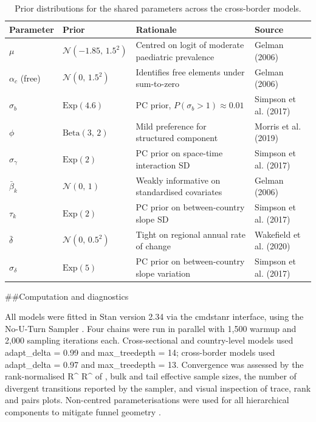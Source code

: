 \documentclass{article}
\begin{document}
\begin{table}[!h]
\centering
\caption{\label{tab:priors}Prior distributions for the shared parameters across the cross-border models. \label{tab:priors}}
\centering
\fontsize{8}{10}\selectfont
\begin{tabular}[t]{llll}
\toprule
Parameter & Prior & Rationale & Source\\
\midrule
$\mu$ & $\mathcal{N}(-1.85,\, 1.5^2)$ & Centred on logit of moderate paediatric prevalence & Gelman (2006)\\
$\alpha_c$ (free) & $\mathcal{N}(0,\, 1.5^2)$ & Identifies free elements under sum-to-zero & Gelman (2006)\\
$\sigma_b$ & $\mathrm{Exp}(4.6)$ & PC prior, $P(\sigma_b > 1) \approx 0.01$ & Simpson et al. (2017)\\
$\phi$ & $\mathrm{Beta}(3,\, 2)$ & Mild preference for structured component & Morris et al. (2019)\\
$\sigma_\gamma$ & $\mathrm{Exp}(2)$ & PC prior on space-time interaction SD & Simpson et al. (2017)\\
\addlinespace
$\bar\beta_k$ & $\mathcal{N}(0,\, 1)$ & Weakly informative on standardised covariates & Gelman (2006)\\
$\tau_k$ & $\mathrm{Exp}(2)$ & PC prior on between-country slope SD & Simpson et al. (2017)\\
$\bar\delta$ & $\mathcal{N}(0,\, 0.5^2)$ & Tight on regional annual rate of change & Wakefield et al. (2020)\\
$\sigma_\delta$ & $\mathrm{Exp}(5)$ & PC prior on between-country slope variation & Simpson et al. (2017)\\
\bottomrule
\end{tabular}
\end{table}

\#\#Computation and diagnostics

\label{sec:compute} All models were fitted in Stan version 2.34
\citep{stan2024} via the cmdstanr interface, using the No-U-Turn Sampler
\citep{hoffman2014}. Four chains were run in parallel with 1,500 warmup
and 2,000 sampling iterations each. Cross-sectional and country-level
models used adapt\_delta = 0.99 and max\_treedepth = 14; cross-border
models used adapt\_delta = 0.97 and max\_treedepth = 13. Convergence was
assessed by the rank-normalised R\^{} R\^{} of
\citep{vehtari2021}, bulk and tail effective sample sizes, the number of
divergent transitions reported by the sampler, and visual inspection of
trace, rank and pairs plots. Non-centred parameterisations were used for
all hierarchical components to mitigate funnel geometry
\citep{betancourt2015}.



\end{document}
